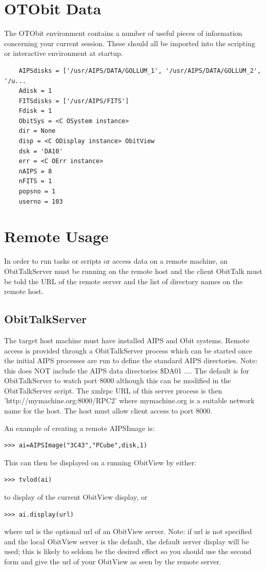 \documentclass[11pt]{report}
\begin{document}
%

\section{OTObit Data}
The OTObit environment contains a number of useful pieces of
information concerning your current session.
These should all be imported into the scripting or interactive
environment at startup.
\begin{verbatim}
    AIPSdisks = ['/usr/AIPS/DATA/GOLLUM_1', '/usr/AIPS/DATA/GOLLUM_2', '/u...
    Adisk = 1
    FITSdisks = ['/usr/AIPS/FITS']
    Fdisk = 1
    ObitSys = <C OSystem instance>
    dir = None
    disp = <C ODisplay instance> ObitView
    dsk = 'DA10'
    err = <C OErr instance>
    nAIPS = 8
    nFITS = 1
    popsno = 1
    userno = 103
\end{verbatim}

\section{Remote Usage\label{Remote}}
In order to run tasks or scripts or access data on a remote machine, 
an ObitTalkServer must be running on the remote host and the client
ObitTalk must be told the URL of the remote server and the list of
directory names on the remote host.

\subsection{ObitTalkServer}
The target host machine must have installed AIPS and Obit systems.
Remote access is provided through a ObitTalkServer process which can
be started once the initial AIPS processes are run to define the
standard AIPS directories.
Note: this does NOT include the AIPS data directories \$DA01 ....
The default is for ObitTalkServer to watch port 8000 although this can
be modified in the ObitTalkServer script.
The xmlrpc URL of this server process is then
'http://mymachine.org:8000/RPC2' where mymachine.org is a suitable
network name for the host.
The host must allow client access to port 8000.

An example of creating a remote AIPSImage is:
\begin{verbatim}
>>> ai=AIPSImage("3C43","PCube",disk,1)
\end{verbatim}
This can then be displayed on a running ObitView by either:
\begin{verbatim}
>>> tvlod(ai)
\end{verbatim}
to display of the current ObitView display, or
\begin{verbatim}
>>> ai.display(url)
\end{verbatim}
where url is the optional url of an ObitView server.
Note: if url is not specified and the local ObitView 
server is the default, the default server display will be used;
this is likely to seldom be the desired effect so you should use the 
second form and give the url of your ObitView as seen by the  
remote server.
\end{document}
